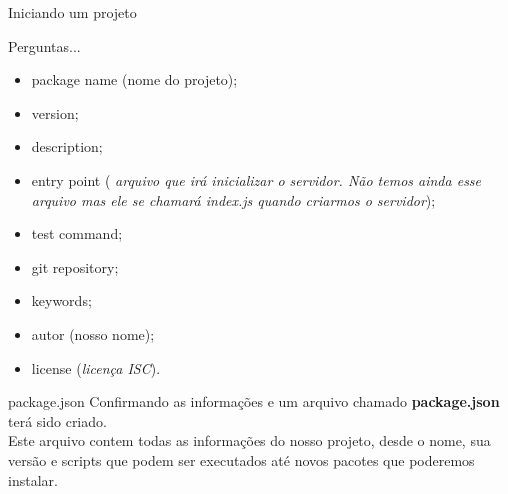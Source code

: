 \documentclass{beamer}
\begin{document}
    \begin{frame}[label=lists]{Iniciando um projeto}
    \begin{exampleblock}{Perguntas...}
        	\begin{itemize}
	\item package name (nome do projeto);
	\item version; 
	\item description; 
	\item entry point ( \textit{arquivo que irá inicializar o servidor. Não temos ainda esse arquivo mas ele se chamará index.js quando criarmos o servidor}); 
	\item test command; 
	\item git repository; 
	\item keywords; 
	\item autor (nosso nome); 
	\item license (\textit{licença ISC}).
        	\end{itemize}
      \end{exampleblock}
    \end{frame}
    \begin{frame}[label=lists]{package.json}
          Confirmando as informações e um arquivo chamado \textbf{package.json} terá sido criado. \\
          Este arquivo contem todas as informações do nosso projeto, desde o nome, sua versão e scripts que podem ser executados até novos pacotes que poderemos instalar.

    \end{frame}
    
\end{document}

